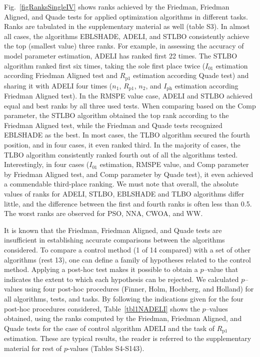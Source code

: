 \documentclass[a4paper,fleqn]{cas-dc}
\begin{document}
Fig.~\ref{figRanksSingleIV} shows
ranks achieved by the Friedman, Friedman Aligned, and Quade tests for applied optimization algorithms in different tasks.
Ranks are tabulated in the supplementary material as well (table S3).
In almost all cases, the algorithms EBLSHADE, ADELI, and STLBO consistently achieve the top (smallest value) three ranks.
For example, in assessing the accuracy of model parameter estimation, ADELI has ranked first 22 times.
The STLBO algorithm ranked first six times,
taking the sole first place twice ($I_{01}$ estimation according Friedman Aligned test and
$R_\mathrm{p1}$ estimation according Quade test)
and sharing it with ADELI four times ($n_1$, $R_\mathrm{p1}$, $n_2$, and $I_\mathrm{ph}$ estimation according Friedman Aligned test).
In the RMSPE value case, ADELI and STLBO achieved equal and best ranks by all three used tests.
When comparing based on the Comp parameter,
the STLBO algorithm obtained the top rank according to the Friedman Aligned test,
while the Friedman and Quade tests recognized EBLSHADE as the best.
In most cases, the TLBO algorithm secured the fourth position, and in four cases, it even ranked third.
In the majority of cases, the TLBO algorithm consistently ranked fourth out of all the algorithms tested.
Interestingly, in four cases ($I_{01}$ estimation, RMSPE value, and Comp parameter by Friedman Aligned test,
and Comp parameter by Quade test),
it even achieved a commendable third-place ranking.
We must note that overall, the absolute values of ranks for ADELI, STLBO, EBLSHADE and TLBO algorithms differ little,
and the difference between the first and fourth ranks is often less than 0.5.
The worst ranks are observed for PSO, NNA, CWOA, and WW.

It is known \cite{Derrac2011} that
the Friedman, Friedman Aligned, and Quade tests are insufficient in establishing accurate comparisons between the algorithms considered.
To compare a control method (1 of 14 compared) with a set of other algorithms (rest 13),
one can define a family of hypotheses related to the control method.
Applying a post-hoc test makes it possible to obtain a $p$--value that indicates the extent to which each hypothesis can be rejected.
We calculated $p$--values using four post-hoc procedures (Finner, Holm, Hochberg, and Holland) for all algorithms, tests, and tasks.
By following the indications given for the four post-hoc procedures considered, Table~\ref{tbl1NADELI} shows the $p$--values
obtained, using the ranks computed by the Friedman, Friedman Aligned, and Quade tests for the case of control algorithm ADELI
and the task of $R_\mathrm{p1}$ estimation.
These are typical results, the reader is referred to the supplementary material for rest of $p$-values (Tables S4-S143).
\end{document}
